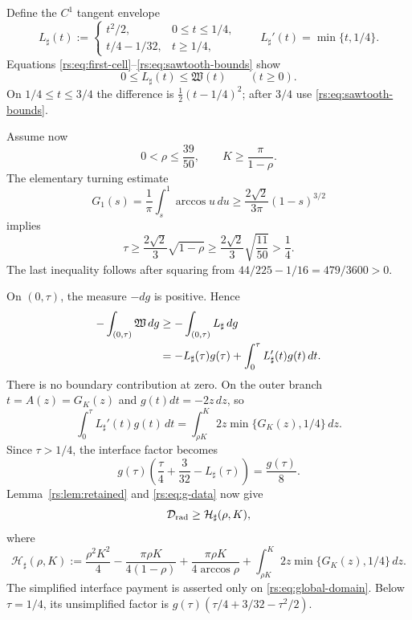 Define the $C^1$ tangent envelope
\begin{equation}
 L_\sharp(t):=
 \begin{cases}
 t^2/2,&0\leq t\leq1/4,\\[2pt]
 t/4-1/32,&t\geq1/4,
 \end{cases}
 \qquad
 L_\sharp'(t)=\min\{t,1/4\}.
 \label{rs:eq:L-sharp}
\end{equation}
Equations \eqref{rs:eq:first-cell}--\eqref{rs:eq:sawtooth-bounds} show
\begin{equation}
 0\leq L_\sharp(t)\leq\mathfrak W(t)
 \qquad(t\geq0).
 \label{rs:eq:L-order}
\end{equation}
On $1/4\leq t\leq3/4$ the difference is
$\tfrac12(t-1/4)^2$; after $3/4$ use
\eqref{rs:eq:sawtooth-bounds}.

Assume now
\begin{equation}
 0<\rho\leq\frac{39}{50},
 \qquad K\geq\frac\pi{1-\rho}.
 \label{rs:eq:global-domain}
\end{equation}
The elementary turning estimate
\begin{equation}
 G_1(s)=\frac1\pi\int_s^1\arccos u\,du
 \geq\frac{2\sqrt2}{3\pi}(1-s)^{3/2}
 \label{rs:eq:G-turning}
\end{equation}
implies
\[
 \tau\geq\frac{2\sqrt2}{3}\sqrt{1-\rho}
 \geq\frac{2\sqrt2}{3}\sqrt{\frac{11}{50}}>\frac14.
\]
The last inequality follows after squaring from
$44/225-1/16=479/3600>0$.

On $(0,\tau)$, the measure $-dg$ is positive.  Hence
\begin{align}
 -\int_{(0,\tau)}\mathfrak W\,dg
 &\geq -\int_{(0,\tau)}L_\sharp\,dg \notag\\
 &=-L_\sharp(\tau)g(\tau)
   +\int_0^\tau L_\sharp'(t)g(t)\,dt.
 \label{rs:eq:R-sharp-parts}
\end{align}
There is no boundary contribution at zero.  On the outer branch
$t=A(z)=G_K(z)$ and $g(t)dt=-2z\,dz$, so
\begin{equation}
 \int_0^\tau L_\sharp'(t)g(t)\,dt
 =\int_{\rho K}^K2z\min\{G_K(z),1/4\}\,dz.
 \label{rs:eq:R-sharp-action}
\end{equation}
Since $\tau>1/4$, the interface factor becomes
\[
 g(\tau)\left(\frac\tau4+\frac3{32}-L_\sharp(\tau)\right)
 =\frac{g(\tau)}8.
\]
Lemma~\ref{rs:lem:retained} and \eqref{rs:eq:g-data} now give
\begin{equation}
 \mathcal D_{\rm rad}\geq\mathcal H_\sharp(\rho,K),
 \label{rs:eq:H-sharp-bound}
\end{equation}
where
\begin{equation}
 \mathcal H_\sharp(\rho,K):=
 \frac{\rho^2K^2}{4}
 -\frac{\pi\rho K}{4(1-\rho)}
 +\frac{\pi\rho K}{4\arccos\rho}
 +\int_{\rho K}^K2z\min\{G_K(z),1/4\}\,dz.
 \label{rs:eq:H-sharp}
\end{equation}
The simplified interface payment is asserted only on
\eqref{rs:eq:global-domain}.  Below $\tau=1/4$, its unsimplified factor is
$g(\tau)(\tau/4+3/32-\tau^2/2)$.

